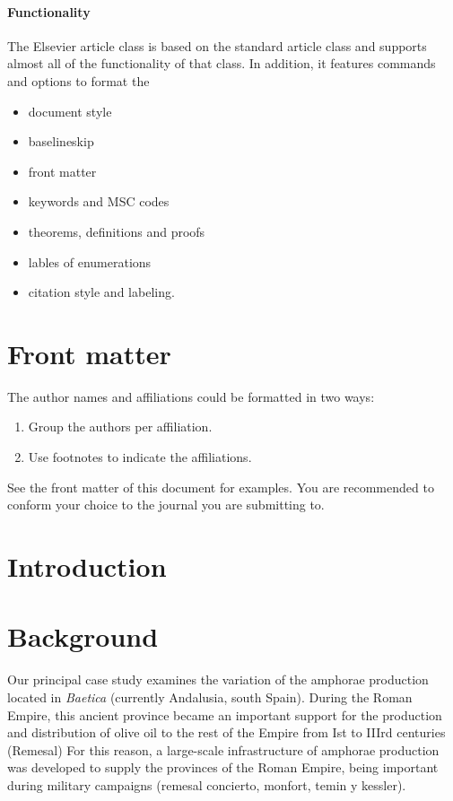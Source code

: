 \documentclass[review]{elsarticle}
\begin{document}
\paragraph{Functionality} The Elsevier article class is based on the standard article class and supports almost all of the functionality of that class. In addition, it features commands and options to format the
\begin{itemize}
\item document style
\item baselineskip
\item front matter
\item keywords and MSC codes
\item theorems, definitions and proofs
\item lables of enumerations
\item citation style and labeling.
\end{itemize}

\section{Front matter}

The author names and affiliations could be formatted in two ways:
\begin{enumerate}[(1)]
\item Group the authors per affiliation.
\item Use footnotes to indicate the affiliations.
\end{enumerate}
See the front matter of this document for examples. You are recommended to conform your choice to the journal you are submitting to.
\section{Introduction}

\section{Background}

Our principal case study examines the variation of the amphorae production located in \emph{Baetica} (currently Andalusia, south Spain). During the Roman Empire, this ancient province became an important support for the production and distribution of  olive oil to the rest of the Empire from Ist to IIIrd centuries (Remesal)
For this reason, a large-scale infrastructure of amphorae production was developed to supply the provinces of the Roman Empire, being important during military campaigns (remesal concierto, monfort, temin y kessler).
\end{document}
